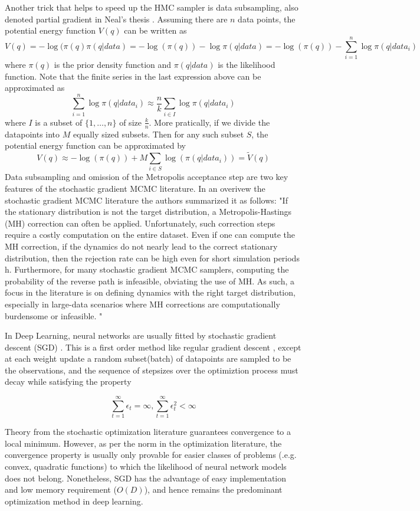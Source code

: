 \documentclass[12pt]{report}
\begin{document}
Another trick that helps to speed up the HMC sampler is data subsampling, also denoted partial gradient in Neal's thesis \cite{neal2012bayesian}.
Assuming there are $n$ data points, the potential energy function $V(q)$ can be written as 
\[ V(q) = -\log( \pi(q) \pi(q|data) = -\log(\pi(q)) -\log \pi(q|data) = -\log(\pi(q)) - \sum_{i=1}^n \log \pi(q|data_i) \]
where $\pi(q)$ is the prior density function and $\pi(q|data)$ is the likelihood function. Note that the finite series in the last expression above can be approximated as 
\[ \sum_{i=1}^n \log \pi(q|data_i) \approx \frac{n}{k} \sum_{i \in I} \log \pi(q|data_i) \]
where $I$ is a subset of $\{1,\dots, n\}$ of size $\frac{k}{n}$. 
More pratically, if we divide the datapoints into $M$ equally sized subsets. Then for any such subset $S$, the potential energy function can be approximated by 
\[ V(q) \approx    -\log(\pi(q)) + M \sum_{i \in S} \log(\pi(q|data_i)) = \tilde{V}(q) \] Data subsampling and omission of the Metropolis acceptance step are two key features of the stochastic gradient MCMC literature. In an overivew the stochastic gradient MCMC literature 
the authors summarized it as follows:
 "If the stationary distribution is not the target distribution, a Metropolis-Hastings (MH) correction can often be applied. Unfortunately, such correction steps require a costly computation on the entire
dataset. Even if one can compute the MH correction, if the dynamics do not nearly lead to the correct stationary distribution, then the rejection rate can be high even for short simulation periods h. Furthermore, for many stochastic gradient MCMC samplers, computing the probability of the reverse path is infeasible, obviating the use of MH. As such, a focus in the literature is on defining dynamics with the right target distribution, especially in large-data scenarios where MH corrections are computationally burdensome or infeasible.
"\cite{ma2015complete}

In Deep Learning, neural networks are usually fitted by stochastic gradient descent (SGD) \cite{ngiam2011optimization}.
This is a first order method like regular gradient descent \cite{wright1999numerical}, except at each weight update a random subset(batch) of datapoints are sampled to be the  observations, and the sequence of stepsizes over the optimiztion process must decay while satisfying the property

\[ \sum_{t=1}^\infty \epsilon_t = \infty , \sum_{t=1}^\infty \epsilon_t^2 < \infty \]

Theory from the stochastic optimization literature \cite{robbins1951stochastic} guarantees convergence to a local minimum. However, as per the norm in the optimization literature, the convergence property is usually only provable for easier classes of problems (.e.g. convex, quadratic functions) to which the likelihood of neural network models does not belong. Nonetheless, SGD has the advantage of easy implementation and low memory requirement ($O(D)$), and hence remains the predominant optimization method in deep learning.  
\end{document}
